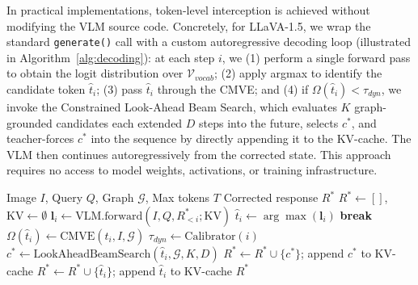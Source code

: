 In practical implementations, token-level interception is achieved without modifying the VLM source code. Concretely, for LLaVA-1.5, we wrap the standard \texttt{generate()} call with a custom autoregressive decoding loop (illustrated in Algorithm~\ref{alg:decoding}): at each step $i$, we (1) perform a single forward pass to obtain the logit distribution over $\mathcal{V}_{vocab}$; (2) apply argmax to identify the candidate token $\hat{t}_i$; (3) pass $\hat{t}_i$ through the CMVE; and (4) if $\Omega(\hat{t}_i) < \tau_{dyn}$, we invoke the Constrained Look-Ahead Beam Search, which evaluates $K$ graph-grounded candidates each extended $D$ steps into the future, selects $c^*$, and teacher-forces $c^*$ into the sequence by directly appending it to the KV-cache. The VLM then continues autoregressively from the corrected state. This approach requires no access to model weights, activations, or training infrastructure.

\begin{algorithm}[t]
\caption{Autoregressive Decoding with CMVKG-Guard Interception}
\label{alg:decoding}
\begin{algorithmic}[1]
\Require Image $I$, Query $Q$, Graph $\mathcal{G}$, Max tokens $T$
\Ensure Corrected response $R^*$
\State $R^* \gets []$, $\text{KV} \gets \emptyset$
    \State $\mathbf{l}_i \gets \text{VLM.forward}(I, Q, R^*_{<i}; \text{KV})$
    \State $\hat{t}_i \gets \arg\max(\mathbf{l}_i)$
        \State \textbf{break}
    \EndIf
    \State $\Omega(\hat{t}_i) \gets \text{CMVE}(\hat{t}_i, I, \mathcal{G})$
    \State $\tau_{dyn} \gets \text{Calibrator}(i)$
        \State $c^* \gets \text{LookAheadBeamSearch}(\hat{t}_i, \mathcal{G}, K, D)$
        \State $R^* \gets R^* \cup \{ c^* \}$; append $c^*$ to KV-cache
    \Else
        \State $R^* \gets R^* \cup \{ \hat{t}_i \}$; append $\hat{t}_i$ to KV-cache
    \EndIf
\EndFor
\State \Return $R^*$
\end{algorithmic}
\end{algorithm}
